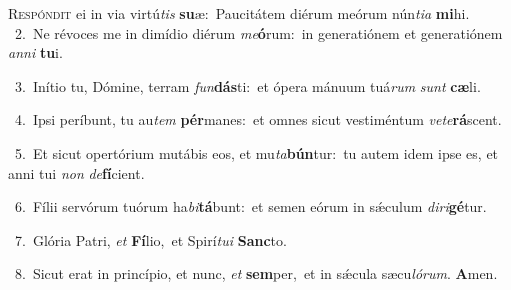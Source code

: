 \lettrine{\initial\textcolor{\initialcolor}{R}}{espóndit} ei in via virtú\textit{tis} \textbf{su}\-æ:~\star Paucitátem diérum meórum nún\-\textit{ti}\-\textit{a} \textbf{mi}\-hi.\\
{\numbfont\textcolor{\numbcolor}{~2.}}~Ne révoces me in dimídio diérum \textit{me}\-\textbf{ó}rum:~\star in generatiónem et generatiónem \textit{an}\-\textit{ni} \textbf{tu}\-i.\par
{\numbfont\textcolor{\numbcolor}{~3.}}~Inítio tu, Dómine, terram \textit{fun}\-\textbf{dás}ti:~\star et ópera mánuum tuá\textit{rum} \textit{sunt} \textbf{cæ}\-li.\par
{\numbfont\textcolor{\numbcolor}{~4.}}~Ipsi períbunt, tu au\textit{tem} \textbf{pér}\-manes:~\star et omnes sicut vestiméntum \textit{ve}\-\textit{te}\textbf{rá}scent.\par
{\numbfont\textcolor{\numbcolor}{~5.}}~Et sicut opertórium mutábis eos, et mu\-\textit{ta}\-\textbf{bún}tur:~\star tu autem idem ipse es, et anni tui \textit{non} \textit{de}\-\textbf{fí}cient.\par
{\numbfont\textcolor{\numbcolor}{~6.}}~Fílii servórum tuórum ha\-\textit{bi}\-\textbf{tá}bunt:~\star et semen eórum in sǽculum \textit{di}\-\textit{ri}\textbf{gé}tur.\par
{\numbfont\textcolor{\numbcolor}{~7.}}~Glória Patri, \textit{et} \textbf{Fí}\-lio,~\star et Spirí\-\textit{tu}\-\textit{i} \textbf{Sanc}\-to.\par
{\numbfont\textcolor{\numbcolor}{~8.}}~Sicut erat in princípio, et nunc, \textit{et} \textbf{sem}\-per,~\star et in sǽcula sæcu\-\textit{ló}\-\textit{rum}. \textbf{A}\-men.\par
